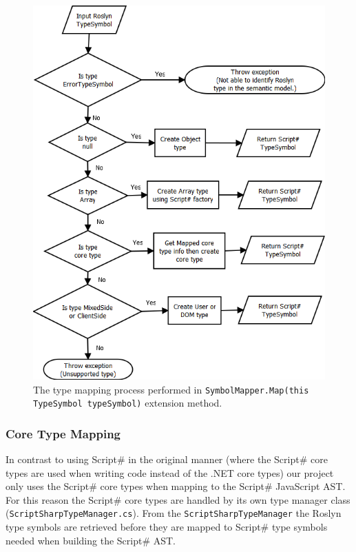 			\begin{figure}
			\begin{center}
					\includegraphics[width=14cm]{resources/images/TypeMappingFlowchart.png}
					\end{center}
				\caption{The type mapping process performed in \texttt{SymbolMapper.Map(this TypeSymbol typeSymbol)} extension method.}
				\label{typeMappingFlowchart}
			\end{figure}


		\subsubsection{Core Type Mapping} %
		\label{subsub:core:type_mapping}
			In contrast to using Script\# in the original manner (where the Script\# core types are used when writing code instead of the .NET core types) our project only uses the Script\# core types when mapping to the Script\# JavaScript AST. For this reason the Script\# core types are handled by its own type manager class (\texttt{ScriptSharpTypeManager.cs}). From the \texttt{ScriptSharpTypeManager} the Roslyn type symbols are retrieved before they are mapped to Script\# type symbols needed when building the Script\# AST.

